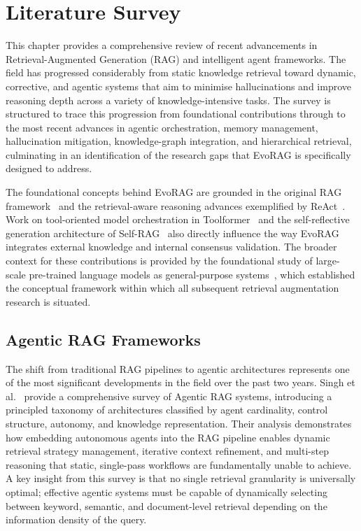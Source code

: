 \chapter{Literature Survey}
 
This chapter provides a comprehensive review of recent advancements in
Retrieval-Augmented Generation (RAG) and intelligent agent frameworks.
The field has progressed considerably from static knowledge retrieval toward dynamic,
corrective, and agentic systems that aim to minimise hallucinations and improve reasoning
depth across a variety of knowledge-intensive tasks.
The survey is structured to trace this progression from foundational contributions
through to the most recent advances in agentic orchestration, memory management,
hallucination mitigation, knowledge-graph integration, and hierarchical retrieval,
culminating in an identification of the research gaps that EvoRAG is specifically
designed to address.

The foundational concepts behind EvoRAG are grounded in the original RAG
framework~\cite{lewis2020rag} and the retrieval-aware reasoning advances exemplified
by ReAct~\cite{yao2022react}.
Work on tool-oriented model orchestration in Toolformer~\cite{schick2023toolformer}
and the self-reflective generation architecture of Self-RAG~\cite{asai2023selfrag}
also directly influence the way EvoRAG integrates external knowledge and internal
consensus validation.
The broader context for these contributions is provided by the foundational study of
large-scale pre-trained language models as general-purpose systems~\cite{bommasani2021foundation},
which established the conceptual framework within which all subsequent retrieval
augmentation research is situated.
 
\section{Agentic RAG Frameworks}
 
The shift from traditional RAG pipelines to agentic architectures represents one of
the most significant developments in the field over the past two years.
Singh et al.~\cite{singh2025agenticrag} provide a comprehensive survey of Agentic RAG
systems, introducing a principled taxonomy of architectures classified by agent
cardinality, control structure, autonomy, and knowledge representation.
Their analysis demonstrates how embedding autonomous agents into the RAG pipeline
enables dynamic retrieval strategy management, iterative context refinement, and
multi-step reasoning that static, single-pass workflows are fundamentally unable to
achieve.
A key insight from this survey is that no single retrieval granularity is universally
optimal; effective agentic systems must be capable of dynamically selecting between
keyword, semantic, and document-level retrieval depending on the information density
of the query.
 
